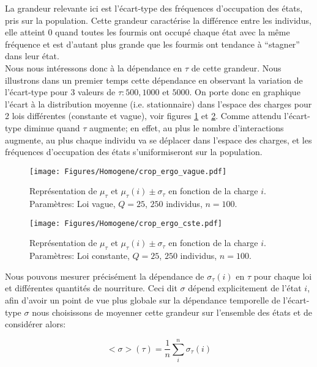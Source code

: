 La grandeur relevante ici est l'écart-type des fréquences d'occupation des états, pris sur la population. Cette grandeur caractérise la différence entre les individus, elle atteint 0 quand toutes les fourmis ont occupé chaque état avec la même fréquence et est d'autant plus grande que les fourmis ont tendance à ``stagner'' dans leur état.  \\

Nous nous intéressons donc à la dépendance en $\tau$ de cette grandeur. Nous illustrons dans un premier temps cette dépendance en observant la variation de l'écart-type pour 3 valeurs de $\tau: 500, 1000$ et $5000$. On porte donc en graphique l'écart à la distribution moyenne (i.e. stationnaire) dans l'espace des charges pour 2 lois différentes (constante et vague), voir figures \ref{ergo_vague} et \ref{ergo_cste}. Comme attendu l'écart-type diminue quand $\tau$ augmente; en effet, au plus le nombre d'interactions augmente, au plus chaque individu va se déplacer dans l'espace des charges, et les fréquences d'occupation des états s'uniformiseront sur la population.\\



\begin{figure}[h]
\centering
\texttt{[image: Figures/Homogene/crop\_ergo\_vague.pdf]}
\caption{Représentation de $\mu_{\tau}$ et $\mu_{\tau}(i)\pm \sigma_{\tau}$ en fonction de la charge $i$. Paramètres: Loi vague, $Q=25$, $250$ individus, $n=100$.}
\label{ergo_vague}
\end{figure}

\begin{figure}[h]
\centering
\texttt{[image: Figures/Homogene/crop\_ergo\_cste.pdf]}
\caption{Représentation de $\mu_{\tau}$ et $\mu_{\tau}(i)\pm \sigma_{\tau}$ en fonction de la charge $i$. Paramètres: Loi constante, $Q=25$, $250$ individus, $n=100$.}
\label{ergo_cste}
\end{figure}


Nous pouvons mesurer précisément la dépendance de $\sigma_{\tau}(i)$ en $\tau$ pour chaque loi et différentes quantités de nourriture. Ceci dit $\sigma$ dépend explicitement de l'état $i$, afin d'avoir un point de vue plus globale sur la dépendance temporelle de l'écart-type $\sigma$ nous choisissons de moyenner cette grandeur sur l'ensemble des états et de considérer alors:

\begin{equation}
<\sigma>(\tau)=\frac{1}{n}\sum_i^n \sigma_{\tau}(i)
\label{moySTD}
\end{equation}

